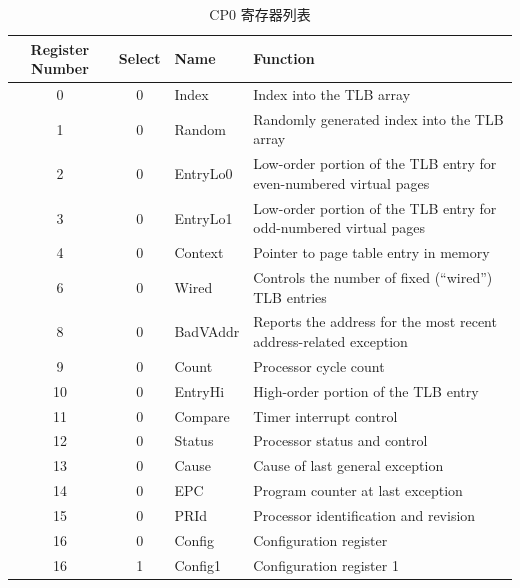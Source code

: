 \documentclass[blue,normal,cn,hide]{elegantbook}
\begin{document}
 \begin{table}
    \renewcommand\arraystretch{1.25}
    \centering
    \begin{tabular}{cclm{}}
        \toprule 
        \rowcolor{black!20} \textbf{Register Number} & \textbf{Select} & \textbf{Name} & \textbf{Function} \\
        \midrule
        \rowcolor{green!20} 0 & 0 & Index & Index into the TLB array \\
        \rowcolor{green!20} 1 & 0 & Random & Randomly generated index into the TLB array \\
        \rowcolor{green!20} 2 & 0 & EntryLo0 & Low-order portion of the TLB entry for
        even-numbered virtual pages \\
        \rowcolor{green!20} 3 & 0 & EntryLo1 & Low-order portion of the TLB entry for
        odd-numbered virtual pages \\
        \rowcolor{green!20} 4 & 0 & Context & Pointer to page table entry in memory \\
        \rowcolor{green!20} 6 & 0 & Wired & Controls the number of fixed (“wired”) TLB
        entries \\
        \rowcolor{cyan!20} 8 & 0 & BadVAddr & Reports the address for the most recent
        address-related exception \\
        \rowcolor{cyan!20} 9 & 0 & Count & Processor cycle count \\
        \rowcolor{green!20} 10 & 0 & EntryHi & High-order portion of the TLB entry \\
        \rowcolor{cyan!20} 11 & 0 & Compare & Timer interrupt control \\
        \rowcolor{cyan!20} 12 & 0 & Status &  Processor status and control \\
        \rowcolor{cyan!20} 13 & 0 & Cause & Cause of last general exception \\
        \rowcolor{cyan!20} 14 & 0 & EPC & Program counter at last exception \\
        \rowcolor{green!20} 15 & 0 & PRId & Processor identification and revision \\
        \rowcolor{green!20} 16 & 0 & Config &  Configuration register \\
        \rowcolor{green!20} 16 & 1 & Config1 & Configuration register 1 \\

        \bottomrule
    \end{tabular}
    \caption{CP0 寄存器列表}
    \label{tab:SiriusCP0}
\end{table}


\end{document}

